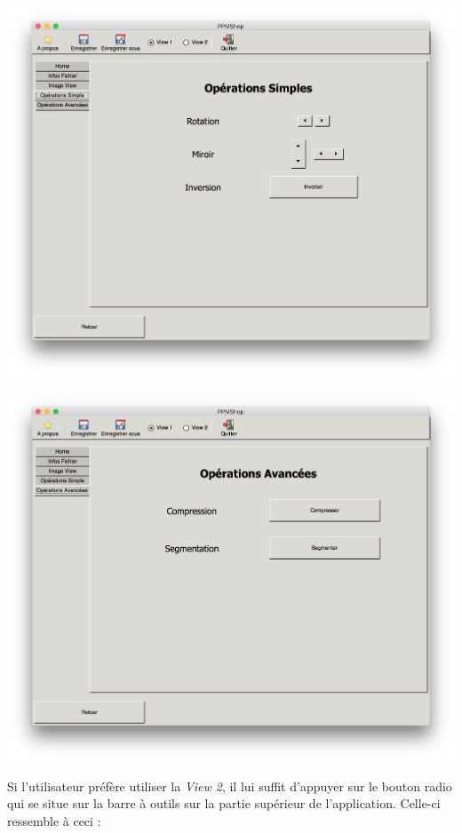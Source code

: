 \documentclass[12pt]{article}
\begin{document}
\begin{center}
\includegraphics[scale = 0.3]{opeSimpleView1}\\
\end{center}
\begin{center}
\includegraphics[scale = 0.3]{opeAdvView1}\\
\end{center}
Si l'utilisateur préfère utiliser la \textit{View 2}, il lui suffit d'appuyer sur le bouton radio qui se situe sur la barre à outils sur la partie supérieur de l'application. Celle-ci ressemble à ceci :\\
\end{document}
